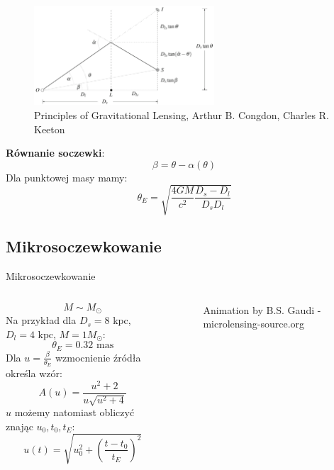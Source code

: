 \documentclass{beamer}
\begin{document}
\begin{frame}
    \begin{figure}
        \centering
        \includegraphics[width=0.6\textwidth]{Screenshot from 2024-06-10 13-41-41.png}
        \caption*{\tiny{Principles of Gravitational
                Lensing, Arthur B. Congdon, Charles R. Keeton\cite{Congdon2018}}}
    \end{figure}
    \textbf{Równanie soczewki}:
    \[\beta = \theta - \alpha(\theta)\]
    Dla punktowej masy mamy\cite{Schneider1992}:
    \[\theta_E = \sqrt{\frac{4GM}{c^2}\frac{D_s-D_l}{D_s D_l}}\]
\end{frame}

\subsection{Mikrosoczewkowanie}
\begin{frame}{Mikrosoczewkowanie}
    \begin{columns}
        \begin{column}{0.6\linewidth}
            \[M \sim M_{\odot}\]
            Na przykład dla $D_s = 8 \text{ kpc}$, $D_l = 4 \text{ kpc}$, $M = 1 M_{\odot}$:
            \[\theta_E = 0.32 \text{ mas}\]
            Dla $u = \frac{\beta}{\theta_E}$ wzmocnienie źródła określa wzór\cite{Schneider1992}:
            \[A(u) = \frac{u^2 + 2}{u \sqrt{u^2 + 4}}\]
            $u$ możemy natomiast obliczyć znając $u_0, t_0, t_E$:
            \[u(t) = \sqrt{u_0^2 + \left(\frac{t-t_0}{t_E}\right)^2}\]
        \end{column}
        \begin{column}{0.4\linewidth}
            \begin{figure}
                \centering
                \caption*{\tiny{Animation by B.S. Gaudi - microlensing-source.org}}
            \end{figure}
        \end{column}
    \end{columns}

\end{frame}
\end{document}
